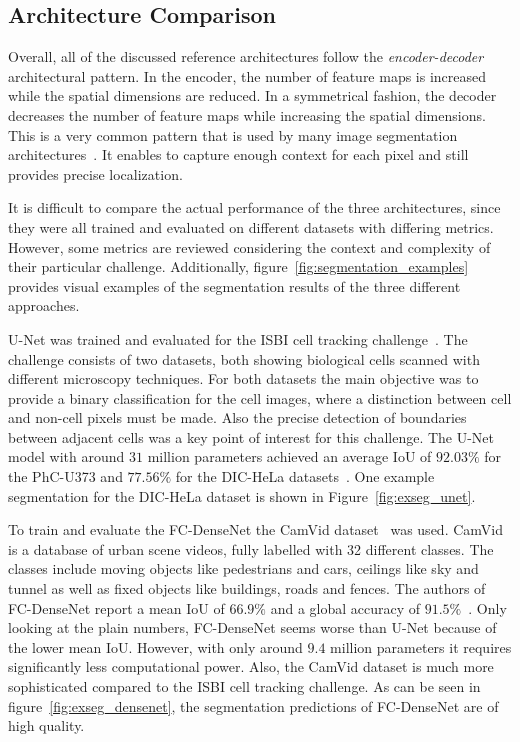 \subsection{Architecture Comparison}
Overall, all of the discussed reference architectures follow the \emph{encoder-decoder} architectural pattern. In the encoder, the number of feature maps is increased while the spatial dimensions are reduced. In a symmetrical fashion, the decoder decreases the number of feature maps while increasing the spatial dimensions. This is a very common pattern that is used by many image segmentation architectures~\cite{imseg_survey20}. It enables to capture enough context for each pixel and still provides precise localization.

It is difficult to compare the actual performance of the three architectures, since they were all trained and evaluated on different datasets with differing metrics. However, some metrics are reviewed considering the context and complexity of their particular challenge. Additionally, figure~\ref{fig:segmentation_examples} provides visual examples of the segmentation results of the three different approaches.

U-Net was trained and evaluated for the ISBI cell tracking challenge~\cite{isbi_challenge12}. The challenge consists of two datasets, both showing biological cells scanned with different microscopy techniques. For both datasets the main objective was to provide a binary classification for the cell images, where a distinction between cell and non-cell pixels must be made. Also the precise detection of boundaries between adjacent cells was a key point of interest for this challenge. The U-Net model with around $31$ million parameters achieved an average IoU of $92.03\%$ for the PhC-U373 and $77.56\%$ for the DIC-HeLa datasets~\cite{unet15}. One example segmentation for the DIC-HeLa dataset is shown in Figure~\ref{fig:exseg_unet}.

To train and evaluate the FC-DenseNet the CamVid dataset~\cite{camvid_challenge} was used. CamVid is a database of urban scene videos, fully labelled with 32 different classes. The classes include moving objects like pedestrians and cars, ceilings like sky and tunnel as well as fixed objects like buildings, roads and fences. The authors of FC-DenseNet report a mean IoU of $66.9\%$ and a global accuracy of $91.5\%$~\cite{denseseg17}. Only looking at the plain numbers, FC-DenseNet seems worse than U-Net because of the lower mean IoU. However, with only around $9.4$ million parameters it requires significantly less computational power. Also, the CamVid dataset is much more sophisticated compared to the ISBI cell tracking challenge. As can be seen in figure~\ref{fig:exseg_densenet}, the segmentation predictions of FC-DenseNet are of high quality.

